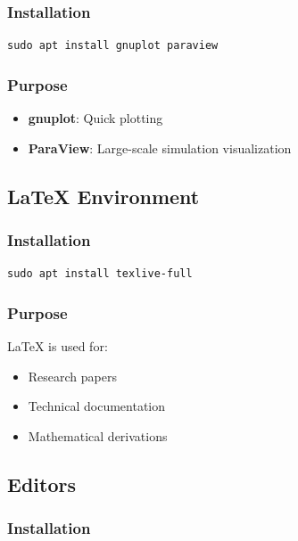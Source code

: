 \subsubsection{Installation}

\begin{lstlisting}
sudo apt install gnuplot paraview
\end{lstlisting}

\subsubsection{Purpose}

\begin{itemize}
    \item \textbf{gnuplot}: Quick plotting
    \item \textbf{ParaView}: Large-scale simulation visualization
\end{itemize}

\subsection{LaTeX Environment}

\subsubsection{Installation}

\begin{lstlisting}
sudo apt install texlive-full
\end{lstlisting}

\subsubsection{Purpose}

LaTeX is used for:

\begin{itemize}
    \item Research papers
    \item Technical documentation
    \item Mathematical derivations
\end{itemize}

\subsection{Editors}

\subsubsection{Installation}


